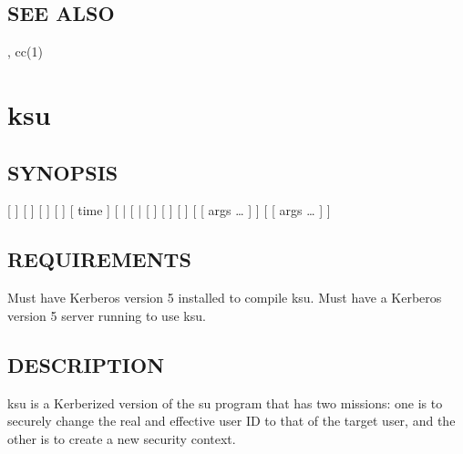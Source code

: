 \documentclass[letterpaper,10pt,english]{sphinxmanual}
\begin{document}
\subsection{SEE ALSO}
\label{\detokenize{user/user_commands/krb5-config:see-also}}
\sphinxAtStartPar
{\hyperref[\detokenize{user/user_config/kerberos:kerberos-7}]{}}, cc(1)

\sphinxstepscope


\section{ksu}
\label{\detokenize{user/user_commands/ksu:ksu}}\label{\detokenize{user/user_commands/ksu:ksu-1}}\label{\detokenize{user/user_commands/ksu::doc}}

\subsection{SYNOPSIS}
\label{\detokenize{user/user_commands/ksu:synopsis}}
\sphinxAtStartPar
{}
{[}  {]}
{[}   {]}
{[}   {]}
{[}  {]}
{[}  time {]}
{[}  | \sphinxstylestrong{\sphinxhyphen{}P}{]}
{[}  | \sphinxstylestrong{\sphinxhyphen{}F}{]}
{[}   {]}
{[}  {]}
{[}  {]}
{[}   {[} args …  {]} {]} {[}  {[} args …  {]} {]}


\subsection{REQUIREMENTS}
\label{\detokenize{user/user_commands/ksu:requirements}}
\sphinxAtStartPar
Must have Kerberos version 5 installed to compile ksu.  Must have a
Kerberos version 5 server running to use ksu.


\subsection{DESCRIPTION}
\label{\detokenize{user/user_commands/ksu:description}}
\sphinxAtStartPar
ksu is a Kerberized version of the su program that has two missions:
one is to securely change the real and effective user ID to that of
the target user, and the other is to create a new security context.
\end{document}
